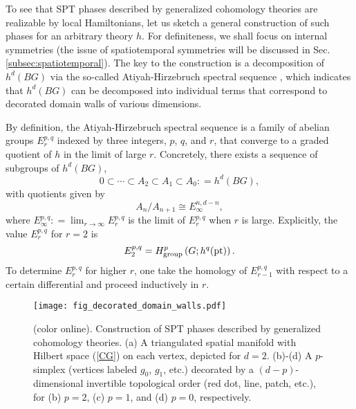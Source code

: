 \documentclass[sort&compress]{elsarticle}
\theoremstyle{theoremstyle}
\theoremstyle{framedtheoremstyle}
\theoremstyle{definitionstyle}
\theoremstyle{definitionstyle}
\theoremstyle{definitionstyle}
\theoremstyle{definitionstyle}
\theoremstyle{nameddefinitionstyle}
\theoremstyle{framednameddefinitionstyle}
\theoremstyle{proofstyle}
\theoremstyle{definitionstyle}
\newcommand{\fromto}{\rightarrow}
\newcommand{\coloneq}{\mathrel{\mathop:}=}
\newcommand{\isomorphic}{\cong}
\newcommand{\paren}[1]{\left( #1 \right)}
\DeclareMathOperator{\pt}{pt}
\begin{document}
To see that SPT phases described by generalized cohomology theories are realizable by local Hamiltonians, let us sketch a general construction of such phases for an arbitrary theory $h$. For definiteness, we shall focus on internal symmetries (the issue of spatiotemporal symmetries will be discussed in Sec.\,\ref{subsec:spatiotemporal}). The key to the construction is a decomposition of $h^d(BG)$ via the so-called Atiyah-Hirzebruch spectral sequence \cite{Adams2}, which indicates that $h^d(BG)$ can be decomposed into individual terms that correspond to decorated domain walls \cite{decorated_domain_walls} of various dimensions.

By definition, the Atiyah-Hirzebruch spectral sequence \cite{Adams2} is a family of abelian groups $E^{p,q}_r$ indexed by three integers, $p$, $q$, and $r$, that converge to a graded quotient of $h$ in the limit of large $r$. Concretely, there exists a sequence of subgroups of $h^d(BG)$,
\begin{equation}
0 \subset \cdots \subset A_2 \subset A_1 \subset A_0 \coloneq h^d(BG), \label{filtration}
\end{equation}
with quotients given by
\begin{equation}
A_n / A_{n+1} \isomorphic E_\infty^{n, d-n}, \label{quotient}
\end{equation}
where $E_\infty^{p,q} \coloneq \lim_{r\fromto \infty} E_r^{p,q}$ is the limit of $E_r^{p,q}$ when $r$ is large. Explicitly, the value $E_r^{p,q}$ for $r=2$ is
\begin{equation}
E_2^{p,q} = H^p_{\rm group}\paren{G; h^q(\pt)}. \label{E2}
\end{equation}
To determine $E_r^{p,q}$ for higher $r$, one take the homology of $E_{r-1}^{p,q}$ with respect to a certain differential and proceed inductively in $r$.

\begin{figure}
\centering
\texttt{[image: fig\_decorated\_domain\_walls.pdf]}
\caption{(color online). Construction of SPT phases described by generalized cohomology theories. (a) A triangulated spatial manifold with Hilbert space (\ref{CG}) on each vertex, depicted for $d=2$. (b)-(d) A $p$-simplex (vertices labeled $g_0$, $g_1$, etc.) decorated by a $(d-p)$-dimensional invertible topological order (red dot, line, patch, etc.), for (b) $p=2$, (c) $p=1$, and (d) $p=0$, respectively. }
\label{fig:decorated_domain_walls}
\end{figure}
\end{document}
